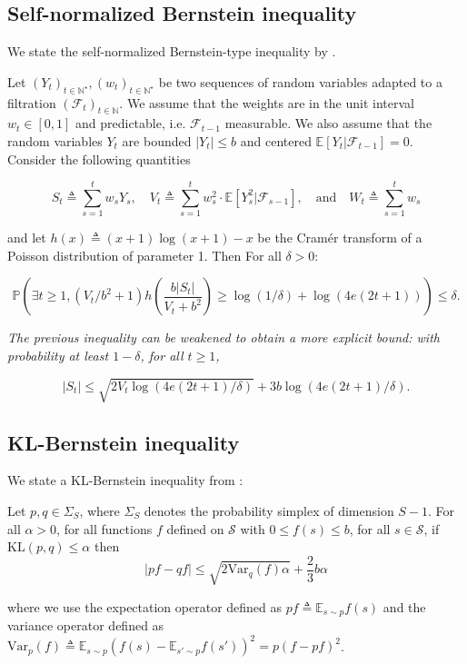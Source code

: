 \documentclass[final,12pt]{colt2026} %
\begin{document}
\subsection{Self-normalized Bernstein inequality}
We state  the self-normalized Bernstein-type inequality by \citep{Menard2021Fast}.
\begin{lemma}\label{Bernstein}
Let $(Y_t)_{t \in \mathbb{N}^\star}, (w_t)_{t \in \mathbb{N}^\star}$ be two sequences of random variables adapted to a filtration $(\mathcal{F}_t)_{t \in \mathbb{N}}$. We assume that the weights are in the unit interval $w_t \in [0, 1]$ and predictable, i.e. $\mathcal{F}_{t-1}$ measurable. We also assume that the random variables $Y_t$ are bounded $|Y_t| \leq b$ and centered $\mathbb{E}[Y_t | \mathcal{F}_{t-1}] = 0$. Consider the following quantities

$$
S_t \triangleq \sum_{s=1}^t w_s Y_s, \quad V_t \triangleq \sum_{s=1}^t w_s^2 \cdot \mathbb{E}[Y_s^2 | \mathcal{F}_{s-1}], \quad \text{and} \quad W_t \triangleq \sum_{s=1}^t w_s
$$

and let $h(x) \triangleq (x+1)\log(x+1) - x$ be the Cramér transform of a Poisson distribution of parameter 1. Then For all $\delta > 0$:

$$
\mathbb{P}\left( \exists t \geq 1, (V_t/b^2 + 1) h \left( \frac{b|S_t|}{V_t + b^2} \right) \geq \log(1/\delta) + \log(4e(2t+1)) \right) \leq \delta.
$$

\textit{The previous inequality can be weakened to obtain a more explicit bound: with probability at least $1 - \delta$, for all $t \geq 1$,}

$$
|S_t| \leq \sqrt{2 V_t \log(4e(2t+1)/\delta)} + 3b \log(4e(2t+1)/\delta).
$$
\end{lemma}
\subsection{KL-Bernstein inequality}
We state a KL-Bernstein inequality from \citep{talebi18a}:
\begin{lemma}\label{KLBernstein}
 Let $p, q \in \Sigma_S$, where $\Sigma_S$ denotes the probability simplex of dimension $S-1$. For all $\alpha > 0$, for all functions $f$ defined on $\mathcal{S}$ with $0 \le f(s) \le b$, for all $s \in \mathcal{S}$, if $\mathrm{KL}(p, q) \le \alpha$ then
$$
|pf - qf| \le \sqrt{2\mathrm{Var}_q(f)\alpha} + \frac{2}{3}b\alpha
$$
\end{lemma}
where we use the expectation operator defined as $pf \triangleq \mathbb{E}_{s \sim p}f(s)$ and the variance operator defined as $\mathrm{Var}_p(f) \triangleq \mathbb{E}_{s \sim p}(f(s) - \mathbb{E}_{s' \sim p}f(s'))^2 = p(f - pf)^2$.
\end{document}
